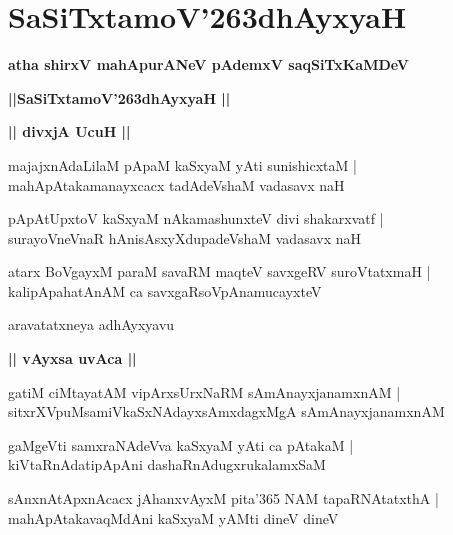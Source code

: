 \documentclass[twoside,12pt,openright]{book}
\def\S{\char'263}
\newcounter{shloka}[chapter]
\def\uvaca#1{\centerline{{\large\textbf{#1}}}}
\begin{document}
\chapter{SaSiTxtamoV\S dhAyxyaH}

\begin{center}
{\LARGE\bfseries atha shirxV mahApurANeV pAdemxV saqSiTxKaMDeV}
\end{center}

\begin{center}
{\LARGE\bfseries ||SaSiTxtamoV\S dhAyxyaH || }
\end{center}

\uvaca{|| divxjA UcuH ||}

\begin{shloka}%
majajxnAdaLilaM pApaM kaSxyaM yAti sunishicxtaM |\\
mahApAtakamanayxcacx tadAdeVshaM vadasavx naH 
\end{shloka}

\begin{shloka}%
pApAtUpxtoV kaSxyaM nAkamashunxteV divi shakarxvatf |\\
surayoVneVnaR hAnisAsxyXdupadeVshaM vadasavx naH 
\end{shloka}

\begin{shloka}%
atarx BoVgayxM paraM savaRM maqteV savxgeRV suroVtatxmaH |\\
kalipApahatAnAM ca savxgaRsoVpAnamucayxteV 
\end{shloka}

\begin{center}
aravatatxneya adhAyxyavu
\end{center}

\uvaca{|| vAyxsa uvAca ||}

\begin{shloka}%
gatiM ciMtayatAM vipArxsUrxNaRM sAmAnayxjanamxnAM |\\
sitxrXVpuMsamiVkaSxNAdayxsAmxdagxMgA sAmAnayxjanamxnAM 
\end{shloka}

\begin{shloka}%
gaMgeVti samxraNAdeVva kaSxyaM yAti ca pAtakaM |\\
kiVtaRnAdatipApAni dashaRnAdugxrukalamxSaM 
\end{shloka}

\begin{shloka}%
sAnxnAtApxnAcacx jAhanxvAyxM pita\char'365 NAM tapaRNAtatxthA |\\
mahApAtakavaqMdAni kaSxyaM yAMti dineV dineV
\end{shloka}
\end{document}
